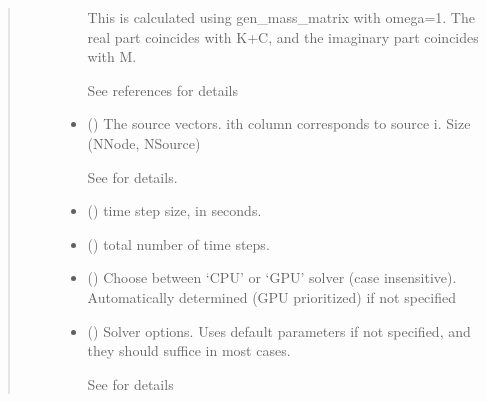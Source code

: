 \documentclass[letterpaper,10pt,english]{sphinxmanual}
\begin{document}
\begin{fulllineitems}
\begin{quote}
\begin{description}
\begin{itemize}
\sphinxAtStartPar
This is calculated using gen\_mass\_matrix with omega=1. The real part coincides with K+C, and the imaginary part coincides with \sphinxhyphen{}M.

\sphinxAtStartPar
See references for details


\item {} 
\sphinxAtStartPar
{} () \textendash{} 
\sphinxAtStartPar
The source vectors. i\sphinxhyphen{}th column corresponds to source i. Size (NNode, NSource)

\sphinxAtStartPar
See {\hyperref[\detokenize{_autosummary/nirfasterff.math.gen_sources:nirfasterff.math.gen_sources}]{}} for details.


\item {} 
\sphinxAtStartPar
{} () \textendash{} time step size, in seconds.

\item {} 
\sphinxAtStartPar
{} () \textendash{} total number of time steps.

\item {} 
\sphinxAtStartPar
{} (\sphinxstyleliteralemphasis{\sphinxupquote{, }}) \textendash{} Choose between ‘CPU’ or ‘GPU’ solver (case insensitive). Automatically determined (GPU prioritized) if not specified

\item {} 
\sphinxAtStartPar
{} ({\hyperref[\detokenize{_autosummary/nirfasterff.utils.SolverOptions:nirfasterff.utils.SolverOptions}]{}}\sphinxstyleliteralemphasis{\sphinxupquote{, }}) \textendash{} 
\sphinxAtStartPar
Solver options. Uses default parameters if not specified, and they should suffice in most cases.

\sphinxAtStartPar
See {\hyperref[\detokenize{_autosummary/nirfasterff.utils.SolverOptions:nirfasterff.utils.SolverOptions}]{}} for details



\end{itemize}
\end{description}
\end{quote}
\end{fulllineitems}
\end{document}
